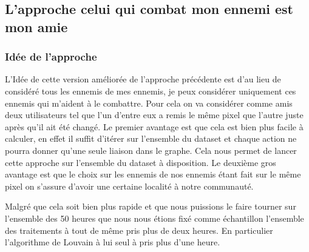 \documentclass[a4paper]{article}
\begin{document}
{\subsection{L'approche celui qui combat mon ennemi est mon amie}

\subsubsection{Idée de l'approche}
L'Idée de cette version améliorée de l'approche précédente est d'au lieu de considéré tous les ennemis de mes ennemis, je peux considérer uniquement ces ennemis qui m'aident à le combattre. Pour cela on va considérer comme amis deux utilisateurs tel que l'un d'entre eux a remis le même pixel que l'autre juste après qu'il ait été changé.
Le premier avantage est que cela est bien plus facile à calculer, en effet il suffit d'itérer sur l'ensemble du dataset et chaque action ne pourra donner qu'une seule liaison dans le graphe. Cela nous permet de lancer cette approche sur l'ensemble du dataset à disposition. Le deuxième gros avantage est que le choix sur les ennemis de nos ennemis étant fait sur le même pixel on s'assure d'avoir une certaine localité à notre communauté.

Malgré que cela soit bien plus rapide et que nous puissions le faire tourner sur l'ensemble des 50 heures que nous nous étions fixé comme échantillon l'ensemble des traitements à tout de même pris plus de deux heures. En particulier l'algorithme de Louvain à lui seul à pris plus d'une heure.

}
\end{document}
